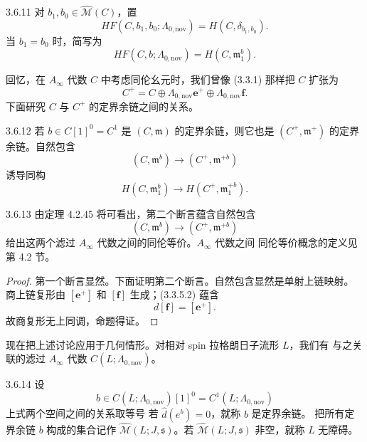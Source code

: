 \begin{definition}{3.6.11}\label{def:3-6-11}
对 $b_1,b_0\in\widehat{\mathcal M}(C)$，置
\[
  HF(C,b_1,b_0;\Lambda_{0,\mathrm{nov}})
  =H(C,\delta_{b_1,b_0}).
\]
当 $b_1=b_0$ 时，简写为
\[
  HF(C,b;\Lambda_{0,\mathrm{nov}})=H(C,\mathfrak m_1^b).
\]
\end{definition}

回忆，在 $A_\infty$ 代数 $C$ 中考虑同伦幺元时，我们曾像 (3.3.1)
那样把 $C$ 扩张为
\[
  C^+=C\oplus\Lambda_{0,\mathrm{nov}}\mathbf e^+
      \oplus\Lambda_{0,\mathrm{nov}}\mathbf f.
\]
下面研究 $C$ 与 $C^+$ 的定界余链之间的关系。

\begin{proposition}{3.6.12}\label{prop:3-6-12}
若 $b\in C[1]^0=C^1$ 是 $(C,\mathfrak m)$ 的定界余链，则它也是
$(C^+,\mathfrak m^+)$ 的定界余链。自然包含
\[
  (C,\mathfrak m^b)\longrightarrow(C^+,\mathfrak m^{+b})
\]
诱导同构
\[
  H(C,\mathfrak m_1^b)\longrightarrow
  H(C^+,\mathfrak m_1^{+b}).
\]
\end{proposition}

\begin{remark}{3.6.13}\label{rem:3-6-13}
由定理 4.2.45 将可看出，第二个断言蕴含自然包含
\[
  (C,\mathfrak m^b)\longrightarrow(C^+,\mathfrak m^{+b})
\]
给出这两个滤过 $A_\infty$ 代数之间的同伦等价。$A_\infty$ 代数之间
同伦等价概念的定义见第 4.2 节。
\end{remark}

\begin{proof}
第一个断言显然。下面证明第二个断言。自然包含显然是单射上链映射。
商上链复形由 $[\mathbf e^+]$ 和 $[\mathbf f]$ 生成；(3.3.5.2) 蕴含
\[
  d[\mathbf f]=[\mathbf e^+].
\]
故商复形无上同调，命题得证。
\end{proof}

现在把上述讨论应用于几何情形。对相对 spin 拉格朗日子流形 $L$，我们有
与之关联的滤过 $A_\infty$ 代数
$C(L;\Lambda_{0,\mathrm{nov}})$。

\begin{definition}{3.6.14}\label{def:3-6-14}
设
\[
  b\in C(L;\Lambda_{0,\mathrm{nov}})[1]^0
  =C^1(L;\Lambda_{0,\mathrm{nov}})
\]
上式两个空间之间的关系取等号
若 $\widehat d(e^b)=0$，就称 $b$ 是定界余链。
把所有定界余链 $b$ 构成的集合记作
$\widehat{\mathcal M}(L;J,\mathfrak s)$。若
$\widehat{\mathcal M}(L;J,\mathfrak s)$ 非空，就称 $L$
无障碍。
\end{definition}

